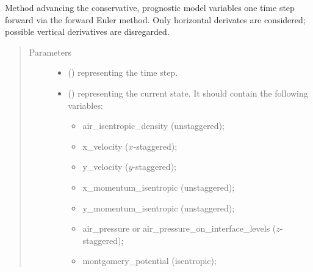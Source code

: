 \documentclass[letterpaper,10pt,english]{sphinxmanual}
\begin{document}
\begin{fulllineitems}
\begin{fulllineitems}
\end{fulllineitems}


\begin{fulllineitems}
\label{\detokenize{api:dycore.prognostic_isentropic_forward_euler.PrognosticIsentropicForwardEuler.step_neglecting_vertical_advection}}
Method advancing the conservative, prognostic model variables one time step forward
via the forward Euler method. Only horizontal derivates are considered; possible vertical
derivatives are disregarded.
\begin{quote}\begin{description}
\item[{Parameters}] \leavevmode\begin{itemize}
\item {} 
 () \textendash{}  representing the time step.

\item {} 
 () \textendash{} 
{\hyperref[\detokenize{api:storages.state_isentropic.StateIsentropic}]{}} representing the current state.
It should contain the following variables:
\begin{itemize}
\item {} 
air\_isentropic\_density (unstaggered);

\item {} 
x\_velocity (\(x\)-staggered);

\item {} 
y\_velocity (\(y\)-staggered);

\item {} 
x\_momentum\_isentropic (unstaggered);

\item {} 
y\_momentum\_isentropic (unstaggered);

\item {} 
air\_pressure or air\_pressure\_on\_interface\_levels (\(z\)-staggered);

\item {} 
montgomery\_potential (isentropic);


\end{itemize}
\end{itemize}
\end{description}
\end{quote}
\end{fulllineitems}
\end{fulllineitems}
\end{document}
